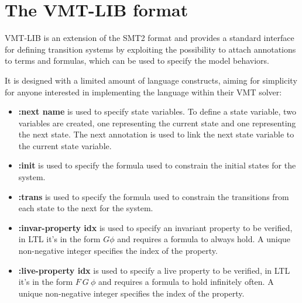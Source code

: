 \section{The VMT-LIB format}
VMT-LIB is an extension of the SMT2 format and provides a standard interface for defining transition systems by exploiting the possibility to attach annotations to terms and formulas, which can be used to specify the model behaviors. \cite{VMT-LIB}

It is designed with a limited amount of language constructs, aiming for simplicity for anyone interested in implementing the language within their VMT solver:
\begin{itemize}[noitemsep]
    \item \textbf{:next name} is used to specify state variables. To define a state variable, two variables are created, one representing the current state and one representing the next state. The next annotation is used to link the next state variable to the current state variable.
    \item \textbf{:init} is used to specify the formula used to constrain the initial states for the system.
    \item \textbf{:trans} is used to specify the formula used to constrain the transitions from each state to the next for the system.
    \item \textbf{:invar-property idx} is used to specify an invariant property to be verified, in LTL it's in the form \begin{math} G \phi \end{math} and requires a formula to always hold.  A unique non-negative integer specifies the index of the property.
    \item \textbf{:live-property idx} is used to specify a live property to be verified, in LTL it's in the form \begin{math} F\ G\ \phi\end{math} and requires a formula to hold infinitely often. A unique non-negative integer specifies the index of the property.
\end{itemize}
\cite{vmt-lib-paper} %


